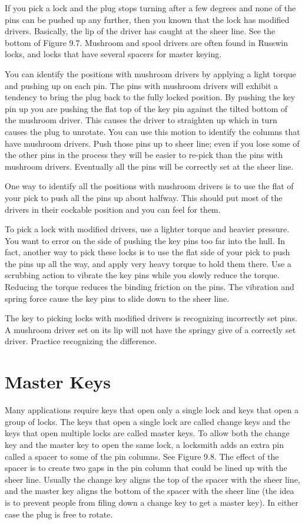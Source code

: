 If you pick a lock and the plug stops turning after a few degrees and none of the pins
can be pushed up any further, then you known that the lock has modified drivers. Basically, 
the lip of the driver has caught at the sheer line. See the bottom of Figure 9.7. Mushroom 
and spool drivers are often found in Russwin locks, and locks that have several spacers for 
master keying. 

You can identify the positions with mushroom drivers by applying a light torque and 
pushing up on each pin. The pins with mushroom drivers will exhibit a tendency to bring 
the plug back to the fully locked position. By pushing the key pin up you are pushing the 
flat top of the key pin against the tilted bottom of the mushroom driver. This causes the 
driver to straighten up which in turn causes the plug to unrotate. You can use this motion 
to identify the columns that have mushroom drivers. Push those pins up to sheer line; even 
if you lose some of the other pins in the process they will be easier to re-pick than the pins 
with mushroom drivers. Eventually all the pins will be correctly set at the sheer line. 

One way to identify all the positions with mushroom drivers is to use the flat of your pick 
to push all the pins up about halfway. This should put most of the drivers in their cockable 
position and you can feel for them. 

To pick a lock with modified drivers, use a lighter torque and heavier pressure. You want 
to error on the side of pushing the key pins too far into the hull. In fact, another way to 
pick these locks is to use the flat side of your pick to push the pins up all the way, and apply 
very heavy torque to hold them there. Use a scrubbing action to vibrate the key pins while 
you slowly reduce the torque. Reducing the torque reduces the binding friction on the pins. 
The vibration and spring force cause the key pins to slide down to the sheer line. 

The key to picking locks with modified drivers is recognizing incorrectly set pins. A 
mushroom driver set on its lip will not have the springy give of a correctly set driver. 
Practice recognizing the difference.

\section{Master Keys}
Many applications require keys that open only a single lock and keys that open a group 
of locks. The keys that open a single lock are called change keys and the keys that open 
multiple locks are called master keys. To allow both the change key and the master key to 
open the same lock, a locksmith adds an extra pin called a spacer to some of the pin columns. 
See Figure 9.8. The effect of the spacer is to create two gaps in the pin column that could 
be lined up with the sheer line. Usually the change key aligns the top of the spacer with the 
sheer line, and the master key aligns the bottom of the spacer with the sheer line (the idea 
is to prevent people from filing down a change key to get a master key). In either case the 
plug is free to rotate. 

